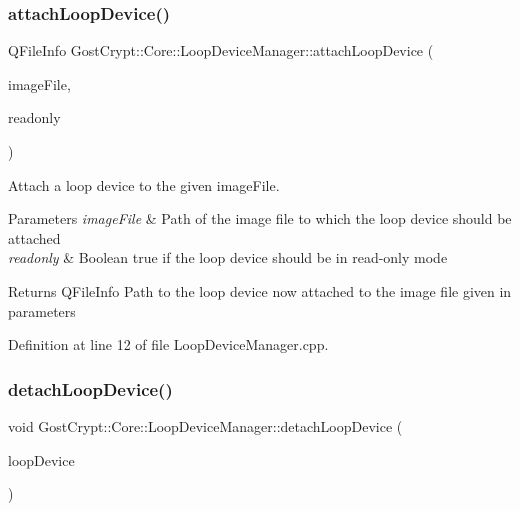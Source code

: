 \subsubsection{\texorpdfstring{attach\+Loop\+Device()}{attachLoopDevice()}}
{\footnotesize\ttfamily Q\+File\+Info Gost\+Crypt\+::\+Core\+::\+Loop\+Device\+Manager\+::attach\+Loop\+Device (\begin{DoxyParamCaption}\item[{Q\+File\+Info}]{image\+File,  }\item[{bool}]{readonly }\end{DoxyParamCaption})\hspace{0.3cm}{\ttfamily [static]}}



Attach a loop device to the given image\+File. 


\begin{DoxyParams}{Parameters}
{\em image\+File} & Path of the image file to which the loop device should be attached \\
\hline
{\em readonly} & Boolean true if the loop device should be in read-\/only mode \\
\hline
\end{DoxyParams}
\begin{DoxyReturn}{Returns}
Q\+File\+Info Path to the loop device now attached to the image file given in parameters 
\end{DoxyReturn}


Definition at line 12 of file Loop\+Device\+Manager.\+cpp.

\mbox{\label{class_gost_crypt_1_1_core_1_1_loop_device_manager_a262d179a6f1151eb6fb5b6ecdd1086f3}} 
\subsubsection{\texorpdfstring{detach\+Loop\+Device()}{detachLoopDevice()}}
{\footnotesize\ttfamily void Gost\+Crypt\+::\+Core\+::\+Loop\+Device\+Manager\+::detach\+Loop\+Device (\begin{DoxyParamCaption}\item[{Q\+File\+Info}]{loop\+Device }\end{DoxyParamCaption})\hspace{0.3cm}{\ttfamily [static]}}



